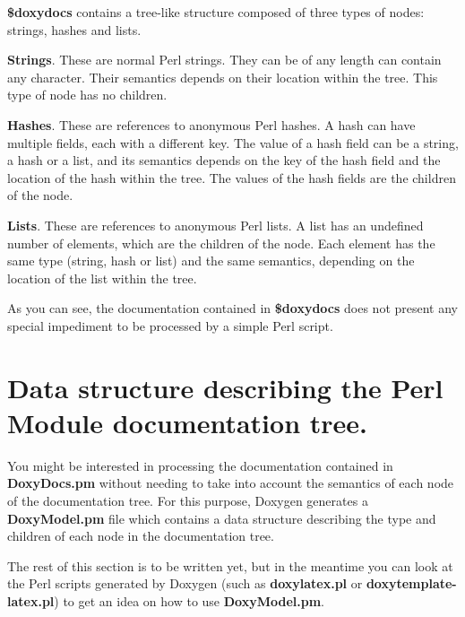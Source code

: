 {\bfseries \$doxydocs} contains a tree-\/like structure composed of three types of nodes: strings, hashes and lists.


\begin{DoxyItemize}
\item {\bfseries Strings}. These are normal Perl strings. They can be of any length can contain any character. Their semantics depends on their location within the tree. This type of node has no children.


\item {\bfseries Hashes}. These are references to anonymous Perl hashes. A hash can have multiple fields, each with a different key. The value of a hash field can be a string, a hash or a list, and its semantics depends on the key of the hash field and the location of the hash within the tree. The values of the hash fields are the children of the node.


\item {\bfseries Lists}. These are references to anonymous Perl lists. A list has an undefined number of elements, which are the children of the node. Each element has the same type (string, hash or list) and the same semantics, depending on the location of the list within the tree.


\end{DoxyItemize}

As you can see, the documentation contained in {\bfseries \$doxydocs} does not present any special impediment to be processed by a simple Perl script.\hypertarget{perlmod_doxymodel_format}{}\section{Data structure describing the Perl Module documentation tree.}\label{perlmod_doxymodel_format}
You might be interested in processing the documentation contained in {\bfseries DoxyDocs.pm} without needing to take into account the semantics of each node of the documentation tree. For this purpose, Doxygen generates a {\bfseries DoxyModel.pm} file which contains a data structure describing the type and children of each node in the documentation tree.

The rest of this section is to be written yet, but in the meantime you can look at the Perl scripts generated by Doxygen (such as {\bfseries doxylatex.pl} or {\bfseries doxytemplate-\/latex.pl}) to get an idea on how to use {\bfseries DoxyModel.pm}. 